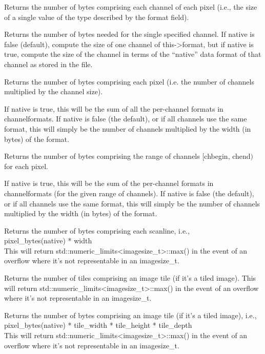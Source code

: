 Returns the number of bytes comprising each channel of each pixel (i.e.,
the size of a single value of the type described by the {\cf format} field).
\apiend

Returns the number of bytes needed for the single specified
channel.  If native is {\cf false} (default), compute the size of one
channel of {\cf this->format}, but if native is {\cf true}, compute the size
of the channel in terms of the ``native'' data format of that
channel as stored in the file.
\apiend

Returns the number of bytes comprising each pixel (i.e. the number of
channels multiplied by the channel size).

If {\cf native} is true, this will be the sum of all the per-channel
formats in {\cf channelformats}.  If {\cf native} is false (the
default), or if all channels use the same format, this will simply be
the number of channels multiplied by the width (in bytes) of the {\cf format}.
\apiend

Returns the number of bytes comprising the range of channels 
  $[${\cf chbegin}, {\cf chend}$)$ for each pixel.

If {\cf native} is true, this will be the sum of the per-channel
formats in {\cf channelformats} (for the given range of channels).  
If {\cf native} is false (the
default), or if all channels use the same format, this will simply be
the number of channels multiplied by the width (in bytes) of the {\cf format}.
\apiend

Returns the number of bytes comprising each scanline,
i.e., \\ {\cf pixel_bytes(native) * width} \\
This will return {\cf std::numeric_limits<imagesize_t>::max()} in the event
of an overflow where it's not representable in an {\cf imagesize_t}.
\apiend

Returns the number of tiles comprising an image tile (if it's a tiled image).
This will return {\cf std::numeric_limits<imagesize_t>::max()} in the event
of an overflow where it's not representable in an {\cf imagesize_t}.
\apiend

Returns the number of bytes comprising an image tile (if it's a tiled
image), i.e., \\ {\cf pixel_bytes(native) * tile_width * tile_height * tile_depth } \\
This will return {\cf std::numeric_limits<imagesize_t>::max()} in the event
of an overflow where it's not representable in an {\cf imagesize_t}.
\apiend

